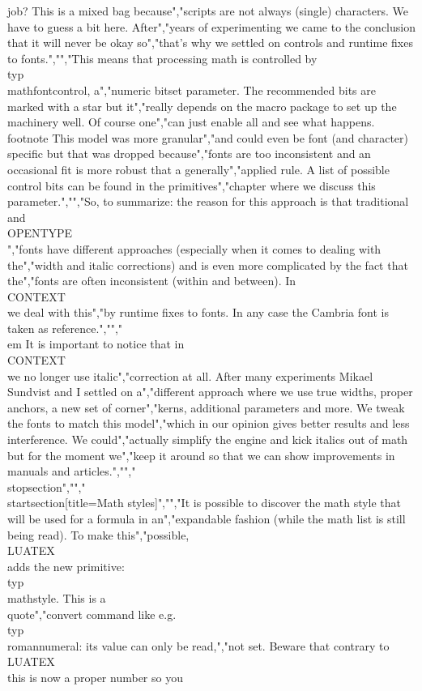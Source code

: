 job? This is a mixed bag because","scripts are not always (single) characters. We have to guess a bit here. After","years of experimenting we came to the conclusion that it will never be okay so","that's why we settled on controls and runtime fixes to fonts.","","This means that processing math is controlled by \\typ {\\mathfontcontrol}, a","numeric bitset parameter. The recommended bits are marked with a star but it","really depends on the macro package to set up the machinery well. Of course one","can just enable all and see what happens. \\footnote {This model was more granular","and could even be font (and character) specific but that was dropped because","fonts are too inconsistent and an occasional fit is more robust that a generally","applied rule.} A list of possible control bits can be found in the primitives","chapter where we discuss this parameter.","","So, to summarize: the reason for this approach is that traditional and \\OPENTYPE\\","fonts have different approaches (especially when it comes to dealing with the","width and italic corrections) and is even more complicated by the fact that the","fonts are often inconsistent (within and between). In \\CONTEXT\\ we deal with this","by runtime fixes to fonts. In any case the Cambria font is taken as reference.","","{\\em It is important to notice that in \\CONTEXT\\ we no longer use italic","correction at all. After many experiments Mikael Sundvist and I settled on a","different approach where we use true widths, proper anchors, a new set of corner","kerns, additional parameters and more. We tweak the fonts to match this model","which in our opinion gives better results and less interference. We could","actually simplify the engine and kick italics out of math but for the moment we","keep it around so that we can show improvements in manuals and articles.}","","\\stopsection","","\\startsection[title={Math styles}]","","It is possible to discover the math style that will be used for a formula in an","expandable fashion (while the math list is still being read). To make this","possible, \\LUATEX\\ adds the new primitive: \\typ {\\mathstyle}. This is a \\quote","{convert command} like e.g. \\typ {\\romannumeral}: its value can only be read,","not set. Beware that contrary to \\LUATEX\\ this is now a proper number so you 
